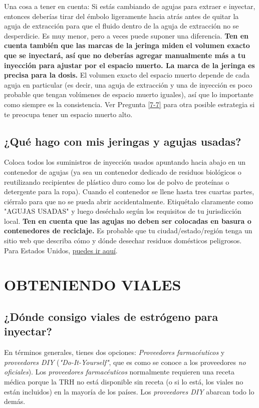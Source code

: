 \documentclass{article}
\begin{document}
Una cosa a tener en cuenta: Si estás cambiando de agujas para extraer e inyectar, entonces deberías tirar del émbolo ligeramente hacia atrás antes de quitar la aguja de extracción para que el fluido dentro de la aguja de extracción no se desperdicie. Es muy menor, pero a veces puede suponer una diferencia. \textbf{Ten en cuenta también que las marcas de la jeringa miden el volumen exacto que se inyectará, así que no deberías agregar manualmente más a tu inyección para ajustar por el espacio muerto. La marca de la jeringa es precisa para la dosis.} El volumen exacto del espacio muerto depende de cada aguja en particular (es decir, una aguja de extracción y una de inyección es poco probable que tengan volúmenes de espacio muerto iguales), así que lo importante como siempre es la consistencia. Ver Pregunta \ref{7-7} para otra posible estrategia si te preocupa tener un espacio muerto alto.

\subsection{¿Qué hago con mis jeringas y agujas usadas?}\label{5-27}

Coloca todos los suministros de inyección usados apuntando hacia abajo en un contenedor de agujas (ya sea un contenedor dedicado de residuos biológicos o reutilizando recipientes de plástico duro como los de polvo de proteínas o detergente para la ropa). Cuando el contenedor se llene hasta tres cuartas partes, ciérralo para que no se pueda abrir accidentalmente. Etiquétalo claramente como "AGUJAS USADAS" y luego deséchalo según los requisitos de tu jurisdicción local. \textbf{Ten en cuenta que las agujas no deben ser colocadas en basura o contenedores de reciclaje.} Es probable que tu ciudad/estado/región tenga un sitio web que describa cómo y dónde desechar residuos domésticos peligrosos. Para Estados Unidos, \href{https://safeneedledisposal.org/}{puedes ir aquí}.



\section{OBTENIENDO VIALES}\label{sv}

\subsection{¿Dónde consigo viales de estrógeno para inyectar?}

En términos generales, tienes dos opciones: \textit{Proveedores farmacéuticos} y \textit{proveedores DIY} (\textit{"Do-It-Yourself"}, que es como se conoce a los proveedores \textit{no oficiales}). Los \textit{proveedores farmacéuticos} normalmente requieren una receta médica porque la TRH no está disponible sin receta (o si lo está, los viales no están incluidos) en la mayoría de los países. Los \textit{proveedores DIY} abarcan todo lo demás.
\end{document}
